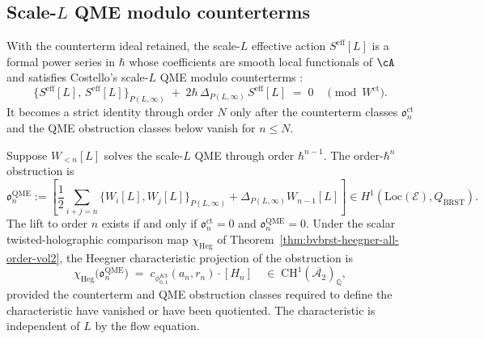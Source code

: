 \subsection{Scale-$L$ QME modulo counterterms}
\label{subsec:costello-trace-qme}

With the counterterm ideal retained, the scale-$L$ effective action
$S^{\mathrm{eff}}[L]$ is a formal power series in $\hbar$ whose
coefficients are smooth local functionals of $\cA$ and satisfies
Costello's scale-$L$ QME modulo counterterms
\cite[Theorem 4.1.1]{Cos11}:
\begin{equation}\label{eq:costello-trace-qme-scale-L}
 \bigl\{S^{\mathrm{eff}}[L],\,S^{\mathrm{eff}}[L]\bigr\}_{P(L,\infty)}
 \;+\;
 2\hbar\,\Delta_{P(L,\infty)}\,S^{\mathrm{eff}}[L]
 \;=\;
 0
 \quad
 \pmod{W^{\mathrm{ct}}}.
\end{equation}
It becomes a strict identity through order \(N\) only after the
counterterm classes \(\mathfrak{o}^{\mathrm{ct}}_n\) and the QME
obstruction classes below vanish for \(n\le N\).

\begin{theorem}
\label{thm:costello-trace-qme-solvable}
Suppose \(W_{<n}[L]\) solves the scale-$L$ QME through order
\(\hbar^{n-1}\). The order-\(\hbar^n\) obstruction is
\begin{equation}\label{eq:costello-trace-qme-obstruction}
 \mathfrak{o}^{\mathrm{QME}}_n
 :=
 \left[
 \frac12\sum_{i+j=n}\{W_i[L],W_j[L]\}_{P(L,\infty)}
 + \Delta_{P(L,\infty)}W_{n-1}[L]
 \right]
 \in H^1\!\left(\mathrm{Loc}(\mathcal E),Q_{\mathrm{BRST}}\right).
\end{equation}
The lift to order \(n\) exists if and only if
\(\mathfrak{o}^{\mathrm{ct}}_n=0\) and
\(\mathfrak{o}^{\mathrm{QME}}_n=0\). Under the scalar
twisted-holographic comparison map \(\chi_{\mathrm{Heg}}\) of
Theorem~\ref{thm:bvbrst-heegner-all-order-vol2}, the Heegner
characteristic projection of the obstruction is
\begin{equation}\label{eq:costello-trace-obstruction}
 \chi_{\mathrm{Heg}}\bigl(\mathfrak{o}^{\mathrm{QME}}_n\bigr)
 \;=\;
	 c_{\phi_{0,1}^{K3}}(a_n,r_n)\cdot[H_n]
 \quad
 \in\;
 \mathrm{CH}^1(\overline{\mathcal{A}_2})_\mathbb{Q},
\end{equation}
provided the counterterm and QME obstruction classes required to define
the characteristic have vanished or have been quotiented. The
characteristic is independent of \(L\) by the flow equation.
\end{theorem}

